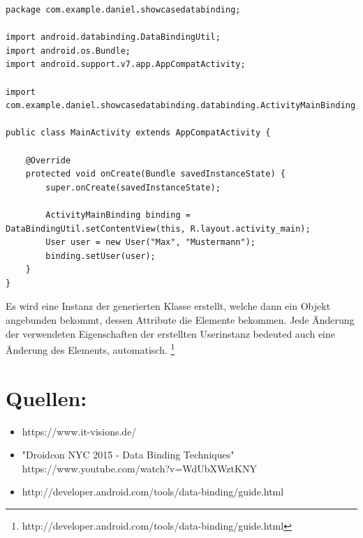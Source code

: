 \documentclass[a4paper,12pt]{article}
\begin{document}
\begin{lstlisting}[caption={Die Aktivitätenklasse nach der Integration einer Datenanbindung.},label=DescriptiveLabel]
package com.example.daniel.showcasedatabinding;

import android.databinding.DataBindingUtil;
import android.os.Bundle;
import android.support.v7.app.AppCompatActivity;

import com.example.daniel.showcasedatabinding.databinding.ActivityMainBinding;

public class MainActivity extends AppCompatActivity {

	@Override
	protected void onCreate(Bundle savedInstanceState) {
		super.onCreate(savedInstanceState);

		ActivityMainBinding binding = DataBindingUtil.setContentView(this, R.layout.activity_main);
		User user = new User("Max", "Mustermann");
		binding.setUser(user);
	}
}
\end{lstlisting}

Es wird eine Instanz der generierten Klasse erstellt, welche dann ein Objekt angebunden bekommt, dessen Attribute die Elemente bekommen. Jede Änderung der verwendeten Eigenschaften der erstellten Userinstanz bedeuted auch eine Änderung des Elements, automatisch. \footnote{http://developer.android.com/tools/data-binding/guide.html}

\newpage
\section{Quellen:}
\begin{itemize}
	\item https://www.it-visions.de/
	\item "Droidcon NYC 2015 - Data Binding Techniques" \\ https://www.youtube.com/watch?v=WdUbXWztKNY
	\item http://developer.android.com/tools/data-binding/guide.html
\end{itemize}
\end{document}
